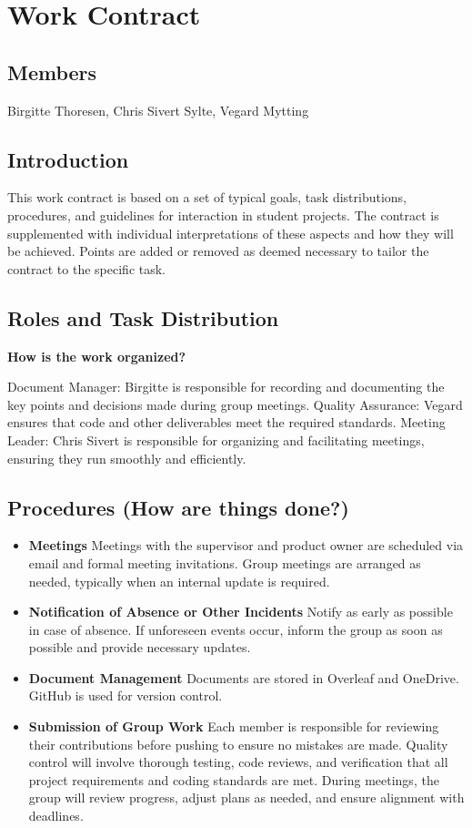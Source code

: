 \chapter{Work Contract}
\section*{Members}
Birgitte Thoresen, Chris Sivert Sylte, Vegard Mytting

\section*{Introduction}
This work contract is based on a set of typical goals, task distributions, procedures, and guidelines for interaction in student projects. The contract is supplemented with individual interpretations of these aspects and how they will be achieved.  
Points are added or removed as deemed necessary to tailor the contract to the specific task.  

\section*{Roles and Task Distribution}
\textbf{How is the work organized?}  

Document Manager: Birgitte is responsible for recording and documenting the key points and decisions made during group meetings.
Quality Assurance: Vegard ensures that code and other deliverables meet the required standards.
Meeting Leader: Chris Sivert is responsible for organizing and facilitating meetings, ensuring they run smoothly and efficiently.

\section*{Procedures (How are things done?)}
\begin{itemize}
    \setlength{\itemsep}{10pt}
    \item \textbf{Meetings}  
    Meetings with the supervisor and product owner are scheduled via email and formal meeting invitations. Group meetings are arranged as needed, typically when an internal update is required.

    \item \textbf{Notification of Absence or Other Incidents}  
    Notify as early as possible in case of absence. If unforeseen events occur, inform the group as soon as possible and provide necessary updates.

    \item \textbf{Document Management}  
    Documents are stored in Overleaf and OneDrive. GitHub is used for version control.

    \item \textbf{Submission of Group Work}   
    Each member is responsible for reviewing their contributions before pushing to ensure no mistakes are made. Quality control will involve thorough testing, code reviews, and verification that all project requirements and coding standards are met. During meetings, the group will review progress, adjust plans as needed, and ensure alignment with deadlines.
    
\end{itemize}

